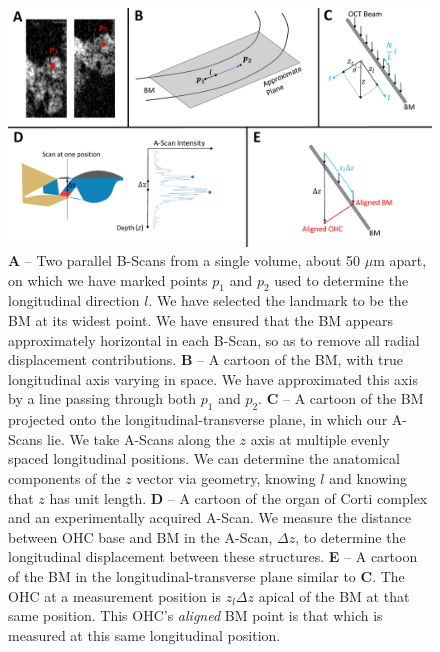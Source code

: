 \documentclass[aip,cp,amsmath,amssymb,reprint]{revtex4-2}
\begin{document}
\begin{figure}[h]
	\includegraphics[width=\textwidth]{Figures/AlignmentExample.pdf}
	\caption{\textbf{A} -- Two parallel B-Scans from a single volume, about 50 $\mu$m apart, on which we have marked points $p_1$ and $p_2$ used to determine the longitudinal direction $l$. We have selected the landmark to be the BM at its widest point. We have ensured that the BM appears approximately horizontal in each B-Scan, so as to remove all radial displacement contributions. \textbf{B} -- A cartoon of the BM, with true longitudinal axis varying in space. We have approximated this axis by a line passing through both $p_1$ and $p_2$. \textbf{C} -- A cartoon of the BM projected onto the longitudinal-transverse plane, in which our A-Scans lie. We take A-Scans along the $z$ axis at multiple evenly spaced longitudinal positions. We can determine the anatomical components of the $z$ vector via geometry, knowing $l$ and knowing that $z$ has unit length. \textbf{D} -- A cartoon of the organ of Corti complex and an experimentally acquired A-Scan. We measure the distance between OHC base and BM in the A-Scan, $\Delta z$, to determine the longitudinal displacement between these structures. \textbf{E} -- A cartoon of the BM in the longitudinal-transverse plane similar to \textbf{C}. The OHC at a measurement position is $z_l \Delta z$ apical of the BM at that same position. This OHC's \textit{aligned} BM point is that which is measured at this same longitudinal position.}
	\label{fig:acq}
\end{figure}
\end{document}
